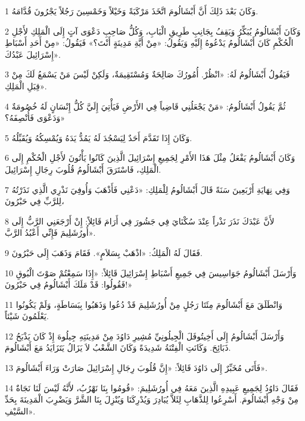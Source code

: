 \par 1 وَكَانَ بَعْدَ ذَلِكَ أَنَّ أَبْشَالُومَ اتَّخَذَ مَرْكَبَةً وَخَيْلاً وَخَمْسِينَ رَجُلاً يَجْرُونَ قُدَّامَهُ.
\par 2 وَكَانَ أَبْشَالُومُ يُبَكِّرُ وَيَقِفُ بِجَانِبِ طَرِيقِ الْبَابِ، وَكُلُّ صَاحِبِ دَعْوَى آتٍ إِلَى الْمَلِكِ لأَجْلِ الْحُكْمِ كَانَ أَبْشَالُومُ يَدْعُوهُ إِلَيْهِ وَيَقُولُ: «مِنْ أَيَّةِ مَدِينَةٍ أَنْتَ؟» فَيَقُولُ: «مِنْ أَحَدِ أَسْبَاطِ إِسْرَائِيلَ عَبْدُكَ».
\par 3 فَيَقُولُ أَبْشَالُومُ لَهُ: «انْظُرْ. أُمُورُكَ صَالِحَةٌ وَمُسْتَقِيمَةٌ، وَلَكِنْ لَيْسَ مَنْ يَسْمَعُ لَكَ مِنْ قِبَلِ الْمَلِكِ».
\par 4 ثُمَّ يَقُولُ أَبْشَالُومُ: «مَنْ يَجْعَلُنِي قَاضِياً فِي الأَرْضِ فَيَأْتِيَ إِلَيَّ كُلُّ إِنْسَانٍ لَهُ خُصُومَةٌ وَدَعْوَى فَأُنْصِفَهُ؟»
\par 5 وَكَانَ إِذَا تَقَدَّمَ أَحَدٌ لِيَسْجُدَ لَهُ يَمُدُّ يَدَهُ وَيُمْسِكُهُ وَيُقَبِّلُهُ.
\par 6 وَكَانَ أَبْشَالُومُ يَفْعَلُ مِثْلَ هَذَا الأَمْرِ لِجَمِيعِ إِسْرَائِيلَ الَّذِينَ كَانُوا يَأْتُونَ لأَجْلِ الْحُكْمِ إِلَى الْمَلِكِ، فَاسْتَرَقَ أَبْشَالُومُ قُلُوبَ رِجَالِ إِسْرَائِيلَ.
\par 7 وَفِي نِهَايَةِ أَرْبَعِينَ سَنَةً قَالَ أَبْشَالُومُ لِلْمَلِكِ: «دَعْنِي فَأَذْهَبَ وَأُوفِيَ نَذْرِي الَّذِي نَذَرْتُهُ لِلرَّبِّ فِي حَبْرُونَ،
\par 8 لأَنَّ عَبْدَكَ نَذَرَ نَذْراً عِنْدَ سُكْنَايَ فِي جَشُورَ فِي أَرَامَ قَائِلاً: إِنْ أَرْجَعَنِي الرَّبُّ إِلَى أُورُشَلِيمَ فَإِنِّي أَعْبُدُ الرَّبَّ».
\par 9 فَقَالَ لَهُ الْمَلِكُ: «اذْهَبْ بِسَلاَمٍ». فَقَامَ وَذَهَبَ إِلَى حَبْرُونَ.
\par 10 وَأَرْسَلَ أَبْشَالُومُ جَوَاسِيسَ فِي جَمِيعِ أَسْبَاطِ إِسْرَائِيلَ قَائِلاً: «إِذَا سَمِعْتُمْ صَوْتَ الْبُوقِ فَقُولُوا: قَدْ مَلَكَ أَبْشَالُومُ فِي حَبْرُونَ!»
\par 11 وَانْطَلَقَ مَعَ أَبْشَالُومَ مِئَتَا رَجُلٍ مِنْ أُورُشَلِيمَ قَدْ دُعُوا وَذَهَبُوا بِبَسَاطَةٍ، وَلَمْ يَكُونُوا يَعْلَمُونَ شَيْئاً.
\par 12 وَأَرْسَلَ أَبْشَالُومُ إِلَى أَخِيتُوفَلَ الْجِيلُونِيِّ مُشِيرِ دَاوُدَ مِنْ مَدِينَتِهِ جِيلُوهَ إِذْ كَانَ يَذْبَحُ ذَبَائِحَ. وَكَانَتِ الْفِتْنَةُ شَدِيدَةً وَكَانَ الشَّعْبُ لاَ يَزَالُ يَتَزَايَدُ مَعَ أَبْشَالُومَ.
\par 13 فَأَتَى مُخَبِّرٌ إِلَى دَاوُدَ قَائِلاً: «إِنَّ قُلُوبَ رِجَالِ إِسْرَائِيلَ صَارَتْ وَرَاءَ أَبْشَالُومَ».
\par 14 فَقَالَ دَاوُدُ لِجَمِيعِ عَبِيدِهِ الَّذِينَ مَعَهُ فِي أُورُشَلِيمَ: «قُومُوا بِنَا نَهْرُبُ، لأَنَّهُ لَيْسَ لَنَا نَجَاةٌ مِنْ وَجْهِ أَبْشَالُومَ. أَسْرِعُوا لِلذَّهَابِ لِئَلاَّ يُبَادِرَ وَيُدْرِكَنَا وَيُنْزِلَ بِنَا الشَّرَّ وَيَضْرِبَ الْمَدِينَةَ بِحَدِّ السَّيْفِ».
